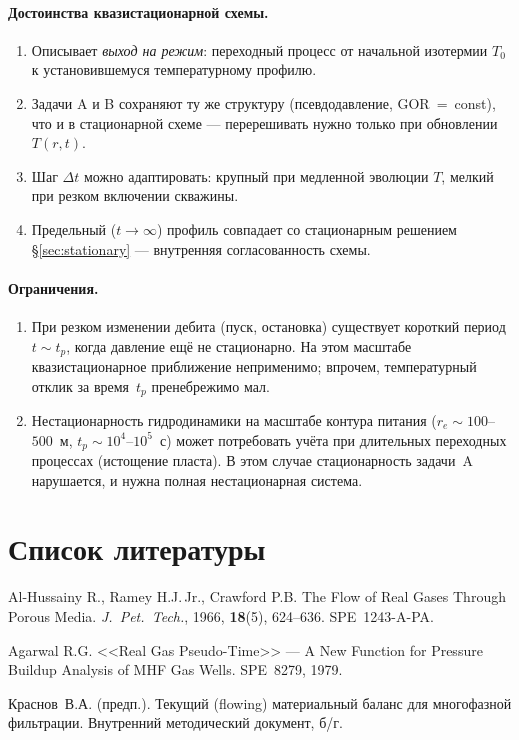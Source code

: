 ﻿\documentclass[12pt,a4paper]{article}
\begin{document}
\paragraph{Достоинства квазистационарной схемы.}
\begin{enumerate}[nosep]
  \item Описывает \emph{выход на режим}: переходный
        процесс от начальной изотермии $T_0$
        к установившемуся температурному профилю.
  \item Задачи A и B сохраняют ту же структуру
        (псевдодавление, GOR~=~const), что и
        в стационарной схеме --- перерешивать нужно
        только при обновлении $T(r,t)$.
  \item Шаг $\Delta t$ можно адаптировать:
        крупный при медленной эволюции $T$,
        мелкий при резком включении скважины.
  \item Предельный ($t \to \infty$) профиль
        совпадает со стационарным решением
        \S\ref{sec:stationary} --- внутренняя
        согласованность схемы.
\end{enumerate}

\paragraph{Ограничения.}
\begin{enumerate}[nosep]
  \item При резком изменении дебита (пуск, остановка)
        существует короткий период $t \sim t_p$, когда
        давление ещё не стационарно. На этом масштабе
        квазистационарное приближение неприменимо;
        впрочем, температурный отклик за время~$t_p$
        пренебрежимо мал.
  \item Нестационарность гидродинамики на масштабе
        контура питания ($r_e \sim 100$--$500$~м,
        $t_p \sim 10^4$--$10^5$~с) может потребовать
        учёта при длительных переходных процессах
        (истощение пласта). В этом случае стационарность
        задачи~A нарушается, и нужна полная нестационарная
        система.
\end{enumerate}


\section*{Список литературы}

\begin{enumerate}[label={[\arabic*]}, nosep]
  \item Al-Hussainy R., Ramey H.J.\,Jr., Crawford P.B.
        The Flow of Real Gases Through Porous Media.
        \textit{J.~Pet.~Tech.}, 1966, \textbf{18}(5), 624--636.
        SPE~1243-A-PA.
  \item Agarwal R.G. <<Real Gas Pseudo-Time>> --- A New Function
        for Pressure Buildup Analysis of MHF Gas Wells.
        SPE~8279, 1979.
  \item Краснов~В.А. (предп.). Текущий (flowing) материальный
        баланс для многофазной фильтрации. Внутренний методический
        документ, б/г.
\end{enumerate}
\end{document}

